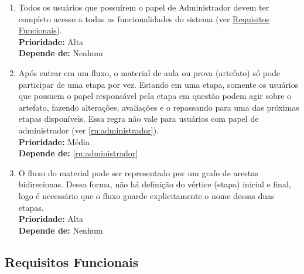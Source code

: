\begin{enumerate}[label=\textbf{RN\protect\twodigits{\theenumi}}, leftmargin=2cm]
	\item \label{rn:administrador} Todos os usuários que possuírem o papel de Administrador devem ter completo acesso a todas as funcionalidades do sistema (ver \hyperref[subsec:requisitos_funcionais]{Requisitos Funcionais}). \\
		\textbf{Prioridade:} Alta \\
		\textbf{Depende de:} Nenhum

	\item \label{rn:artefato_na_etapa} Após entrar em um fluxo, o material de aula ou prova (artefato) só pode participar de uma etapa por vez. Estando em uma etapa, somente os usuários que possuem o papel responsável pela etapa em questão podem agir sobre o artefato, fazendo alterações, avaliações e o repassando para uma das próximas etapas disponíveis. Essa regra não vale para usuários com papel de administrador (ver \hyperref[rn:administrador]{\ref{rn:administrador}}). \\
		\textbf{Prioridade:} Média \\
		\textbf{Depende de:} \hyperref[rn:administrador]{\ref{rn:administrador}}

	\item \label{rn:etapa_inicial_e_final_do_fluxo} O fluxo do material pode ser representado por um grafo de arestas bidirecionas. Dessa forma, não há definição do vértice (etapa) inicial e final, logo é necessário que o fluxo guarde explicitamente o nome dessas duas etapas. \\
		\textbf{Prioridade:} Alta \\
		\textbf{Depende de:} Nenhum

\end{enumerate}

\subsection{Requisitos Funcionais} \label{subsec:requisitos_funcionais}
		
